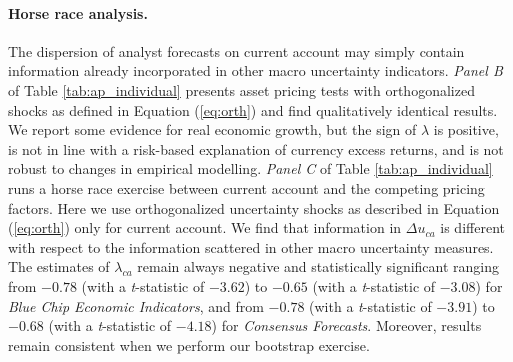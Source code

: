 \paragraph{Horse race analysis.}
The dispersion of analyst forecasts on current account may simply contain information already incorporated in other macro uncertainty indicators. \emph{Panel B} of Table \ref{tab:ap_individual} presents asset pricing tests with orthogonalized shocks as defined in Equation (\ref{eq:orth}) and find qualitatively identical results.  We report some evidence for real economic growth, but the sign of $\lambda$ is positive, is not in line with a risk-based explanation of currency excess returns, and is not robust to changes in empirical modelling. \emph{Panel C} of Table \ref{tab:ap_individual} runs a horse race exercise between current account and the competing pricing factors. Here we use orthogonalized uncertainty shocks as described in Equation (\ref{eq:orth}) only for current account. We find that information in $\Delta u_{ca}$ is different with respect to the information scattered in other macro uncertainty measures. The estimates of $\lambda_{ca}$  remain always negative and statistically significant ranging from $-0.78$ (with a \emph{t}-statistic of $-3.62$) to $-0.65$ (with a \emph{t}-statistic of $-3.08$) for \emph{Blue Chip Economic Indicators}, and from $-0.78$ (with a \emph{t}-statistic of $-3.91$) to $-0.68$ (with a \emph{t}-statistic of $-4.18$) for \emph{Consensus Forecasts}. Moreover, results remain consistent when we perform our bootstrap exercise.

